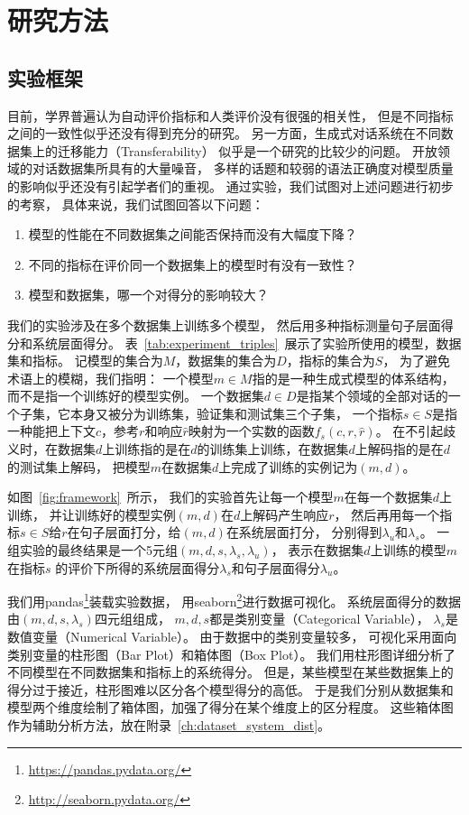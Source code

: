 \chapter{研究方法}\label{ch:method}

\section{实验框架}\label{sec:eval_framework}
目前，学界普遍认为自动评价指标和人类评价没有很强的相关性，
但是不同指标之间的一致性似乎还没有得到充分的研究。
另一方面，生成式对话系统在不同数据集上的迁移能力（Transferability）
似乎是一个研究的比较少的问题。
开放领域的对话数据集所具有的大量噪音，
多样的话题和较弱的语法正确度对模型质量的影响似乎还没有引起学者们的重视。
通过实验，我们试图对上述问题进行初步的考察，
具体来说，我们试图回答以下问题：
\begin{enumerate}
    \item 模型的性能在不同数据集之间能否保持而没有大幅度下降？
    \item 不同的指标在评价同一个数据集上的模型时有没有一致性？
    \item 模型和数据集，哪一个对得分的影响较大？
\end{enumerate}

我们的实验涉及在多个数据集上训练多个模型，
然后用多种指标测量句子层面得分和系统层面得分。
表~\ref{tab:experiment_triples}~展示了实验所使用的模型，数据集和指标。
记模型的集合为$M$，数据集的集合为$D$，指标的集合为$S$，
为了避免术语上的模糊，我们指明：
一个模型$m \in M$指的是一种生成式模型的体系结构，而不是指一个训练好的模型实例。
一个数据集$d \in D$是指某个领域的全部对话的一个子集，它本身又被分为训练集，验证集和测试集三个子集，
一个指标$s \in S$是指一种能把上下文$c$，参考$r$和响应$\hat{r}$映射为一个实数的函数$f_s(c, r, \hat{r})$。
在不引起歧义时，在数据集$d$上训练指的是在$d$的训练集上训练，在数据集$d$上解码指的是在$d$的测试集上解码，
把模型$m$在数据集$d$上完成了训练的实例记为$(m, d)$。

如图~\ref{fig:framework}~所示，
我们的实验首先让每一个模型$m$在每一个数据集$d$上训练，
并让训练好的模型实例$(m, d)$在$d$上解码产生响应$r$，
然后再用每一个指标$s \in S$给$r$在句子层面打分，给$(m, d)$在系统层面打分，
分别得到$\lambda_{u}$和$\lambda_{s}$。
一组实验的最终结果是一个5元组$(m, d, s, \lambda_{s}, \lambda_{u})$，
表示在数据集$d$上训练的模型$m$在指标$s$
的评价下所得的系统层面得分$\lambda_s$和句子层面得分$\lambda_u$。

我们用pandas\footnote{\url{https://pandas.pydata.org/}}装载实验数据，
用seaborn\footnote{\url{http://seaborn.pydata.org/}}进行数据可视化。
系统层面得分的数据由$(m, d, s, \lambda_s)$四元组组成，
$m, d, s$都是类别变量（Categorical Variable），
$\lambda_s$是数值变量（Numerical Variable）。
由于数据中的类别变量较多，
可视化采用面向类别变量的柱形图（Bar Plot）和箱体图（Box Plot）。
我们用柱形图详细分析了不同模型在不同数据集和指标上的系统得分。
但是，某些模型在某些数据集上的得分过于接近，柱形图难以区分各个模型得分的高低。
于是我们分别从数据集和模型两个维度绘制了箱体图，加强了得分在某个维度上的区分程度。
这些箱体图作为辅助分析方法，放在附录~\ref{ch:dataset_system_dist}。

